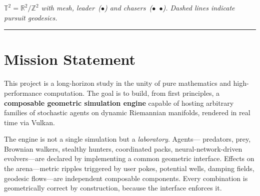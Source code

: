 \begin{center}

\vspace{-0.3em}
{\small\itshape\color{gray}
  $\mathbb{T}^2 = \mathbb{R}^2/\mathbb{Z}^2$ with mesh,
  leader~({\color{orange!80!red}$\bullet$}) and
  chasers~({\color{cyan!60!blue}$\bullet$}\ {\color{magenta!65!black}$\bullet$}).
  Dashed lines indicate pursuit geodesics.}
\end{center}

\vspace{0.3em}
\noindent\rule{\linewidth}{0.4pt}
\vspace{0.3em}

\section*{Mission Statement}

This project is a long-horizon study in the unity of pure mathematics and
high-performance computation. The goal is to build, from first principles, a
\textbf{composable geometric simulation engine} capable of hosting arbitrary
families of stochastic agents on dynamic Riemannian manifolds, rendered in
real time via Vulkan.

The engine is not a single simulation but a \emph{laboratory}. Agents---
predators, prey, Brownian walkers, stealthy hunters, coordinated packs,
neural-network-driven evolvers---are declared by implementing a common
geometric interface. Effects on the arena---metric ripples triggered by user
pokes, potential wells, damping fields, geodesic flows---are independent
composable components. Every combination is geometrically correct by
construction, because the interface enforces it.


